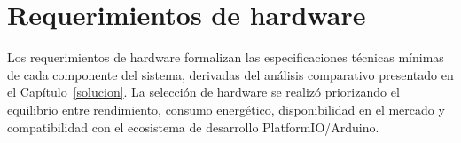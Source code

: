 \section{Requerimientos de hardware}\label{sec:req_hardware}

Los requerimientos de hardware formalizan las especificaciones técnicas mínimas de cada componente del sistema, derivadas del análisis comparativo presentado en el Capítulo~\ref{solucion}. La selección de hardware se realizó priorizando el equilibrio entre rendimiento, consumo energético, disponibilidad en el mercado y compatibilidad con el ecosistema de desarrollo PlatformIO/Arduino.

\begin{table}[H]
\begin{center}
\caption{Requerimientos de hardware del sistema SAR.}
\end{center}
\end{table}
